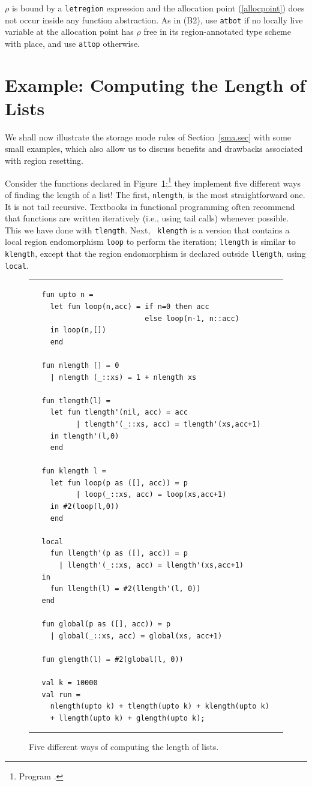 \documentclass[12pt]{book}
\begin{document}
 $\rho$ is bound by a {\tt letregion} expression
and the allocation point (\ref{allocpoint}) does not occur inside any
function abstraction.  As in (B2), use {\tt atbot} if no locally live
variable at the allocation point has $\rho$ free in its
region-annotated type scheme with place, and use {\tt attop}
otherwise.


\section{Example: Computing the Length of Lists}
\label{length.sec}
We shall now illustrate the storage mode rules of
Section~\ref{sma.sec} with some small examples, which also allow us to
discuss benefits and drawbacks associated with region resetting.

Consider the functions declared in
Figure~\ref{length.fig};\footnote{Program .}
they implement five different ways of finding the length of a list!
The first, {\tt nlength}, is the most straightforward one.  It is not
tail recursive. Textbooks in functional programming often recommend
that functions are written iteratively (i.e., using tail calls)
whenever possible. This we have done with {\tt tlength}.  Next, {\tt
  klength} is a version that contains a local
%
region endomorphism {\tt loop} to perform the iteration; {\tt llength}
is similar to {\tt klength}, except that the region endomorphism is
declared outside {\tt llength}, using 
%
{\tt local}.
\begin{figure}
\hrule
\medskip
\begin{verbatim}
   fun upto n = 
     let fun loop(n,acc) = if n=0 then acc
                           else loop(n-1, n::acc)
     in loop(n,[])
     end

   fun nlength [] = 0
     | nlength (_::xs) = 1 + nlength xs

   fun tlength(l) =
     let fun tlength'(nil, acc) = acc
           | tlength'(_::xs, acc) = tlength'(xs,acc+1)
     in tlength'(l,0)
     end

   fun klength l =
     let fun loop(p as ([], acc)) = p
           | loop(_::xs, acc) = loop(xs,acc+1)
     in #2(loop(l,0))
     end

   local 
     fun llength'(p as ([], acc)) = p
       | llength'(_::xs, acc) = llength'(xs,acc+1)
   in
     fun llength(l) = #2(llength'(l, 0))
   end

   fun global(p as ([], acc)) = p
     | global(_::xs, acc) = global(xs, acc+1)

   fun glength(l) = #2(global(l, 0))

   val k = 10000
   val run = 
     nlength(upto k) + tlength(upto k) + klength(upto k) 
     + llength(upto k) + glength(upto k);
\end{verbatim}
\caption{Five different ways of computing the length of lists.}
\bigskip
\label{length.fig}
\hrule
\end{figure}
\end{document}
